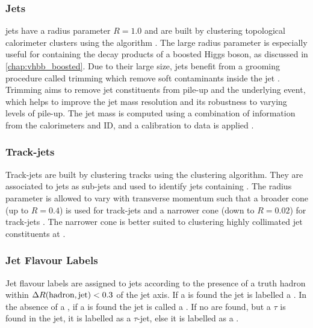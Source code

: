\subsubsection{\texorpdfstring{\LargeR}{Large-R} Jets}
\LargeR jets have a radius parameter $R=1.0$ and are built by clustering topological calorimeter clusters using the \antikt algorithm \cite{Butterworth:2008iy}.
The large radius parameter is especially useful for containing the decay products of a boosted Higgs boson, as discussed in \cref{chap:vhbb_boosted}. 
Due to their large size, \largeR jets benefit from a grooming procedure called trimming which remove soft contaminants inside the jet \cite{ATLAS:2020jwz,ATLAS:2013bqs}.
Trimming aims to remove jet constituents from pile-up and the underlying event, which helps to improve the jet mass resolution and its robustness to varying levels of pile-up.
The jet mass is computed using a combination of information from the calorimeters and ID, and a calibration to data is applied \cite{JETM-2018-02}.


\subsubsection{Track-jets}
Track-jets are built by clustering tracks using the \antikt clustering algorithm.
They are associated to \largeR jets as sub-jets and used to identify \largeR jets containing \bhadrons.
The radius parameter is allowed to vary with transverse momentum such that a broader cone (up to $R=0.4$) is used for \lowpt track-jets and a narrower cone (down to $R=0.02$) for \highpt track-jets \cite{Krohn:2009zg,ATL-PHYS-PUB-2017-010}.
The narrower cone is better suited to clustering highly collimated jet constituents at \highpt.

\subsubsection{Jet Flavour Labels}
Jet flavour labels are assigned to \smallR jets according to the presence of a truth hadron within ${\Delta R(\text{hadron},\text{jet})<0.3}$ of the jet axis. If a \bhadron is found the jet is labelled a \bjet. In the absence of a \bhadron, if a \chadron is found the jet is called a \cjet.
If no \borchadrons are found, but a $\tau$ is found in the jet, it is labelled as a $\tau$-jet, else it is labelled as a \ljet.

